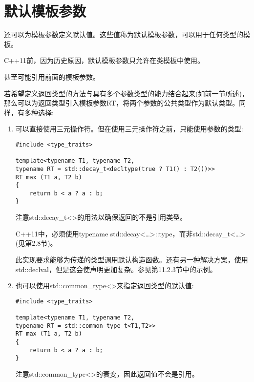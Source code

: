 \section{默认模板参数}

还可以为模板参数定义默认值。这些值称为默认模板参数，可以用于任何类型的模板。

\begin{tcolorbox}[colback=webgreen!5!white,colframe=webgreen!75!black]
\hspace*{0.75cm}C++11前，因为历史原因，默认模板参数只允许在类模板中使用。
\end{tcolorbox}

甚至可能引用前面的模板参数。

若希望定义返回类型的方法与具有多个参数类型的能力结合起来(如前一节所述)，那么可以为返回类型引入模板参数RT，将两个参数的公共类型作为默认类型。同样，有多种选择:

\begin{enumerate}
\item 
可以直接使用三元操作符。但在使用三元操作符之前，只能使用参数的类型:

\begin{lstlisting}[style=styleCXX]
#include <type_traits>

template<typename T1, typename T2,
typename RT = std::decay_t<decltype(true ? T1() : T2())>>
RT max (T1 a, T2 b)
{
	return b < a ? a : b;
}
\end{lstlisting}

注意std::decay\_t<>的用法以确保返回的不是引用类型。

\begin{tcolorbox}[colback=webgreen!5!white,colframe=webgreen!75!black]
\hspace*{0.75cm}C++11中，必须使用typename std::decay<…>::type，而非std::decay\_t<…>(见第2.8节)。
\end{tcolorbox}

此实现要求能够为传递的类型调用默认构造函数。还有另一种解决方案，使用std::declval，但是这会使声明更加复杂。参见第11.2.3节中的示例。

\item
也可以使用std::common\_type<>来指定返回类型的默认值:

\begin{lstlisting}[style=styleCXX]
#include <type_traits>

template<typename T1, typename T2,
typename RT = std::common_type_t<T1,T2>>
RT max (T1 a, T2 b)
{
	return b < a ? a : b;
}
\end{lstlisting}

注意std::common\_type<>的衰变，因此返回值不会是引用。
\end{enumerate}

